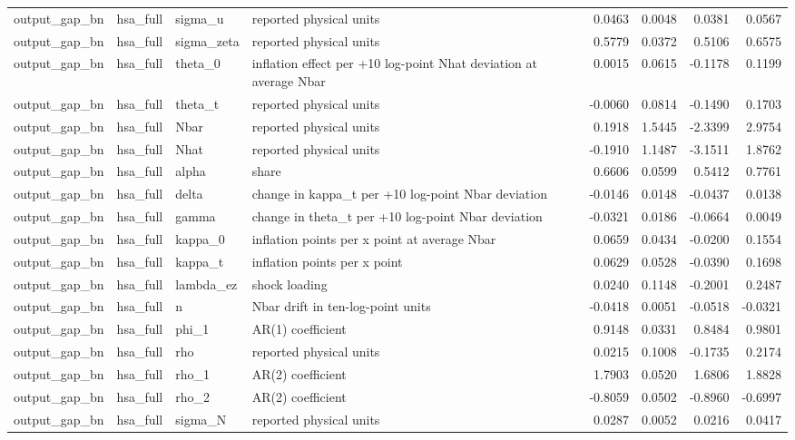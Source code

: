 \begin{tabular}{llllrrrr}
output\_gap\_bn & hsa\_full & sigma\_u & reported physical units & 0.0463 & 0.0048 & 0.0381 & 0.0567 \\
output\_gap\_bn & hsa\_full & sigma\_zeta & reported physical units & 0.5779 & 0.0372 & 0.5106 & 0.6575 \\
output\_gap\_bn & hsa\_full & theta\_0 & inflation effect per +10 log-point Nhat deviation at average Nbar & 0.0015 & 0.0615 & -0.1178 & 0.1199 \\
output\_gap\_bn & hsa\_full & theta\_t & reported physical units & -0.0060 & 0.0814 & -0.1490 & 0.1703 \\
output\_gap\_bn & hsa\_full & Nbar & reported physical units & 0.1918 & 1.5445 & -2.3399 & 2.9754 \\
output\_gap\_bn & hsa\_full & Nhat & reported physical units & -0.1910 & 1.1487 & -3.1511 & 1.8762 \\
output\_gap\_bn & hsa\_full & alpha & share & 0.6606 & 0.0599 & 0.5412 & 0.7761 \\
output\_gap\_bn & hsa\_full & delta & change in kappa\_t per +10 log-point Nbar deviation & -0.0146 & 0.0148 & -0.0437 & 0.0138 \\
output\_gap\_bn & hsa\_full & gamma & change in theta\_t per +10 log-point Nbar deviation & -0.0321 & 0.0186 & -0.0664 & 0.0049 \\
output\_gap\_bn & hsa\_full & kappa\_0 & inflation points per x point at average Nbar & 0.0659 & 0.0434 & -0.0200 & 0.1554 \\
output\_gap\_bn & hsa\_full & kappa\_t & inflation points per x point & 0.0629 & 0.0528 & -0.0390 & 0.1698 \\
output\_gap\_bn & hsa\_full & lambda\_ez & shock loading & 0.0240 & 0.1148 & -0.2001 & 0.2487 \\
output\_gap\_bn & hsa\_full & n & Nbar drift in ten-log-point units & -0.0418 & 0.0051 & -0.0518 & -0.0321 \\
output\_gap\_bn & hsa\_full & phi\_1 & AR(1) coefficient & 0.9148 & 0.0331 & 0.8484 & 0.9801 \\
output\_gap\_bn & hsa\_full & rho & reported physical units & 0.0215 & 0.1008 & -0.1735 & 0.2174 \\
output\_gap\_bn & hsa\_full & rho\_1 & AR(2) coefficient & 1.7903 & 0.0520 & 1.6806 & 1.8828 \\
output\_gap\_bn & hsa\_full & rho\_2 & AR(2) coefficient & -0.8059 & 0.0502 & -0.8960 & -0.6997 \\
output\_gap\_bn & hsa\_full & sigma\_N & reported physical units & 0.0287 & 0.0052 & 0.0216 & 0.0417 \\

\end{tabular}
